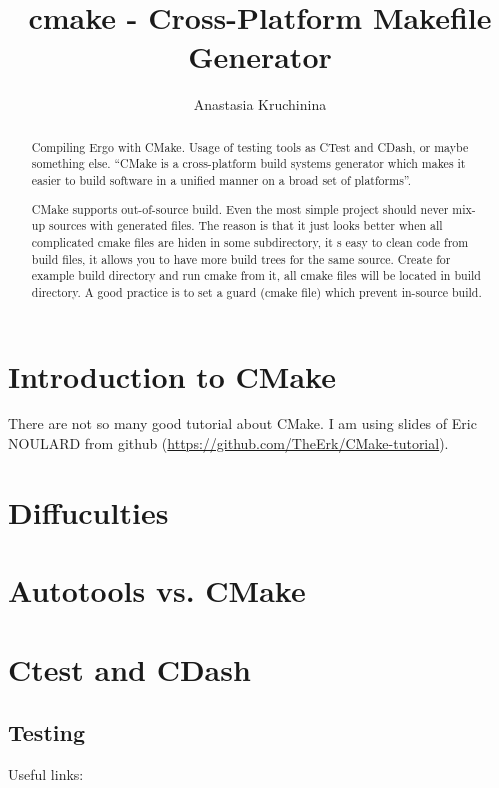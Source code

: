 \documentclass[a4paper,10pt]{article}
\title{cmake - Cross-Platform Makefile Generator}
\author{Anastasia Kruchinina}
\begin{document}
\maketitle

\begin{abstract}
Compiling Ergo with CMake. Usage of testing tools as CTest and CDash, or maybe something else.
``CMake is a cross-platform build systems generator which makes
it easier to build software in a unified manner on a broad set
of platforms''.


CMake supports out-of-source build.
Even the most simple project should never mix-up sources with
generated files. The reason is that it just looks better when all complicated cmake files are hiden in some subdirectory, it s easy to clean code from build files, it allows you to have more build trees for the same source.
Create for example build directory and run cmake from it, all cmake files will be located in build directory.
A good practice is to set a guard (cmake file) which prevent in-source build.




\end{abstract}

\section{Introduction to CMake}

There are not so many good tutorial about CMake. I am using slides of Eric NOULARD from github (\url{https://github.com/TheErk/CMake-tutorial}).


\section{Diffuculties}


\section{Autotools vs. CMake}



\section{Ctest and CDash}
\subsection{Testing}

Useful links:
\end{document}
